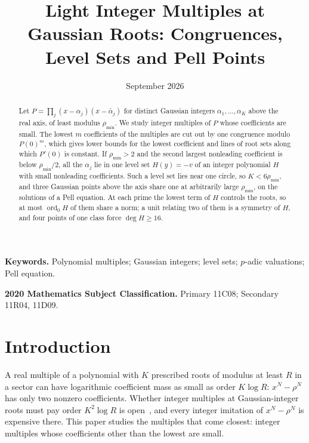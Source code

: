 \documentclass[11pt]{article}
\title{Light Integer Multiples at Gaussian Roots: Congruences, Level Sets and Pell Points}
\author{\shortstack{Bangyen Pham\\
\small Independent Researcher\\
\small\href{mailto:bangyenp@gmail.com}{\texttt{bangyenp@gmail.com}}\\
\small\href{https://orcid.org/0009-0006-9928-2088}{ORCID: 0009-0006-9928-2088}}}
\date{September 2026}
\begin{document}
\maketitle

\begin{abstract}
Let $P=\prod_j(x-\alpha_j)(x-\bar\alpha_j)$ for distinct Gaussian integers
$\alpha_1,\ldots,\alpha_K$ above the real axis, of least modulus
$\rho_{\min}$.  We study integer multiples of $P$ whose coefficients are
small.  The lowest $m$ coefficients of the multiples are cut out by one
congruence modulo $P(0)^m$, which gives lower bounds for the lowest
coefficient and lines of root sets along which $P'(0)$ is constant.  If
$\rho_{\min}>2$ and the second largest nonleading coefficient is below
$\rho_{\min}/2$, all the $\alpha_j$ lie in one level set $H(y)=-v$ of an
integer polynomial $H$ with small nonleading coefficients.  Such a level set
lies near one circle, so $K<6\rho_{\min}$, and three Gaussian points
above the axis share one at arbitrarily large $\rho_{\min}$, on the
solutions of a Pell equation.  At each prime the lowest term of $H$ controls
the roots, so at most $\operatorname{ord}_0H$ of them share a norm; a unit
relating two of them is a symmetry of $H$, and four points of one class
force $\deg H\ge16$.
\end{abstract}

\noindent\textbf{Keywords.} Polynomial multiples; Gaussian integers; level
sets; $p$-adic valuations; Pell equation.

\noindent\textbf{2020 Mathematics Subject Classification.} Primary 11C08; Secondary 11R04, 11D09.

\section{Introduction}\label{sec:setting}

A real multiple of a polynomial with $K$ prescribed roots of modulus at
least $R$ in a sector can have logarithmic coefficient mass as small as
order $K\log R$: $x^N-\rho^N$ has only two nonzero coefficients.  Whether
integer multiples at Gaussian-integer roots must pay order $K^2\log R$ is
open~\cite{coefficient-mass-sectors}, and every integer imitation of
$x^N-\rho^N$ is expensive there.  This paper studies the multiples that
come closest: integer multiples whose coefficients other than the lowest
are small.
\end{document}
